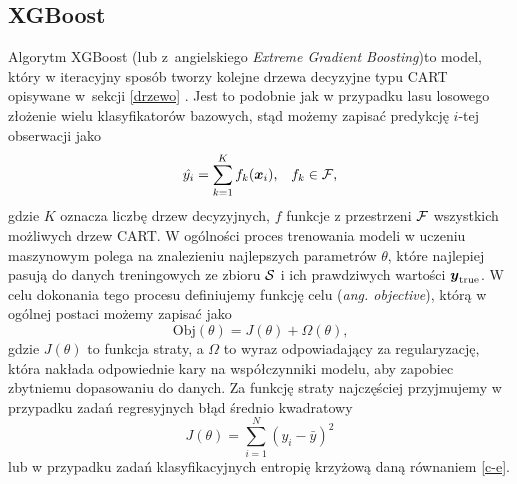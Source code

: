 \documentclass[inzynierska]{pwr_wmat_praca_dyplomowa}
\theoremstyle{plain}
\numberwithin{theorem}{chapter}
\theoremstyle{definition}
\numberwithin{theorem}{chapter}
\begin{document}
\subsection{XGBoost}
Algorytm XGBoost (lub z~angielskiego \textit{Extreme Gradient Boosting})to model, który w iteracyjny sposób tworzy kolejne drzewa decyzyjne typu CART opisywane w~sekcji \ref{drzewo} \cite{xgboost}. Jest to podobnie jak w przypadku lasu losowego złożenie wielu klasyfikatorów bazowych, stąd możemy zapisać predykcję $i$-tej obserwacji jako
$$ \hat{y_i} = \sum_{k=1}^K f_k(\boldsymbol{x}_i) \text{,} \quad f_k \in \mathcal{F} \text{,} $$
gdzie $K$ oznacza liczbę drzew decyzyjnych, $f$ funkcje z przestrzeni $\mathcal{F}$ wszystkich możliwych drzew CART.
W ogólności proces trenowania modeli w uczeniu maszynowym polega na znalezieniu najlepszych parametrów $\theta$, które najlepiej pasują do danych treningowych ze zbioru $\mathcal{S}$ i ich prawdziwych wartości $\boldsymbol{y}_{\text{true}}$. W celu dokonania tego procesu definiujemy funkcję celu (\textit{ang. objective}), którą w ogólnej postaci możemy zapisać jako
$$ \text{Obj}(\theta) = J(\theta) + \Omega(\theta) \text{,}$$
gdzie $J(\theta)$ to funkcja straty, a $\Omega$ to wyraz odpowiadający za regularyzację, która nakłada odpowiednie kary na współczynniki modelu, aby zapobiec zbytniemu dopasowaniu do danych. Za funkcję straty najczęściej przyjmujemy w przypadku zadań regresyjnych błąd średnio kwadratowy
$$ J(\theta) = \sum_{i=1}^{N} (y_i - \bar{y})^2 $$
lub w przypadku zadań klasyfikacyjnych entropię krzyżową daną równaniem \ref{c-e}.
\end{document}
